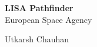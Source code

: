 \documentclass[11pt,fleqn]{book} %
\begin{document}

\begingroup
\thispagestyle{empty}
\centering
\vspace*{8cm}
\par\normalfont\fontsize{35}{35}\sffamily\selectfont
\textbf{LISA Pathfinder}\\
{\LARGE European Space Agency}\par %
\vspace*{1cm}
{\Huge Utkarsh Chauhan}\par %
\endgroup
\let\cleardoublepage\clearpage
{} %

\pagestyle{empty} %

\tableofcontents %
\end{document}

